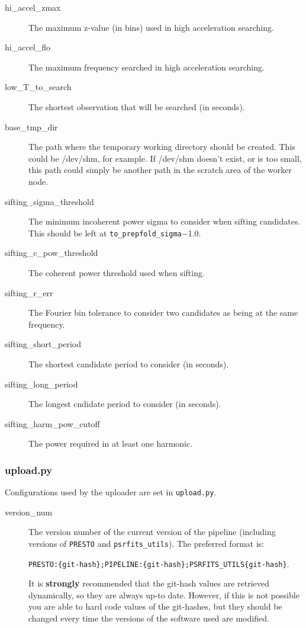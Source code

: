 \documentclass[12pt]{article}
\begin{document}
\begin{description}
    \item[hi\_accel\_zmax] The maximum z-value (in bins) used in high acceleration searching.
    \item[hi\_accel\_flo] The maximum frequency searched in high acceleration searching.
    \item[low\_T\_to\_search] The shortest observation that will be searched (in seconds).
    \item[base\_tmp\_dir] The path where the temporary working directory should be created. This could be /dev/shm, for example. If /dev/shm doesn't exist, or is too small, this path could simply be another path in the scratch area of the worker node.
    \item[sifting\_sigma\_threshold] The minimum incoherent power sigma to consider when sifting candidates. This should be left at \texttt{to\_prepfold\_sigma}$-$1.0.
    \item[sifting\_c\_pow\_threshold] The coherent power threshold used when sifting.
    \item[sifting\_r\_err] The Fourier bin tolerance to consider two candidates as being at the same frequency.
    \item[sifting\_short\_period] The shortest candidate period to consider (in seconds).
    \item[sifting\_long\_period] The longest cndidate period to consider (in seconds).
    \item[sifting\_harm\_pow\_cutoff] The power required in at least one harmonic.
\end{description}
    

\subsubsection{upload.py}
Configurations used by the uploader are set in \texttt{upload.py}.

\begin{description}
    \item[version\_num] The version number of the current version of the pipeline (including versions of \texttt{PRESTO} and \texttt{psrfits\_utils}). The preferred format is:
    
    \texttt{PRESTO:\{git-hash\};PIPELINE:\{git-hash\};PSRFITS\_UTILS\{git-hash\}}. 
    
    It is \textbf{strongly} recommended that the git-hash values are retrieved dynamically, so they are always up-to date. However, if this is not possible you are able to hard code values of the git-hashes, but they should be changed every time the versions of the software used are modified.
\end{description}
\end{document}
